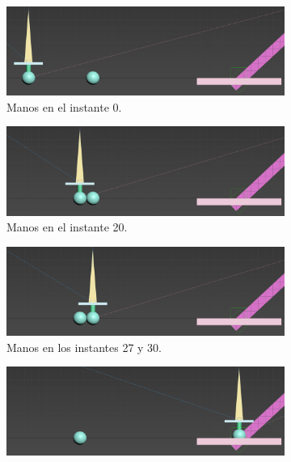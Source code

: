 \begin{figure}[H]
   \centering
\begin{subfigure}[t]{0.48\textwidth}
    \centering
    \includegraphics[width=\textwidth]{imagenes/espada/keyframes/0.png}
    \caption{Manos en el instante 0.}
 \end{subfigure}
\hfill
 \begin{subfigure}[t]{0.48\textwidth}
    \centering
    \includegraphics[width=\textwidth]{imagenes/espada/keyframes/20.png}
    \caption{Manos en el instante 20.}
 \end{subfigure}
\hfill
 \begin{subfigure}[t]{0.48\textwidth}
    \centering
    \includegraphics[width=\textwidth]{imagenes/espada/keyframes/27y30.png}
    \caption{Manos en los instantes 27 y 30.}
 \end{subfigure}
\hfill
 \begin{subfigure}[t]{0.48\textwidth}
    \centering
    \includegraphics[width=\textwidth]{imagenes/espada/keyframes/65y70.png}

\end{subfigure}
\end{figure}
